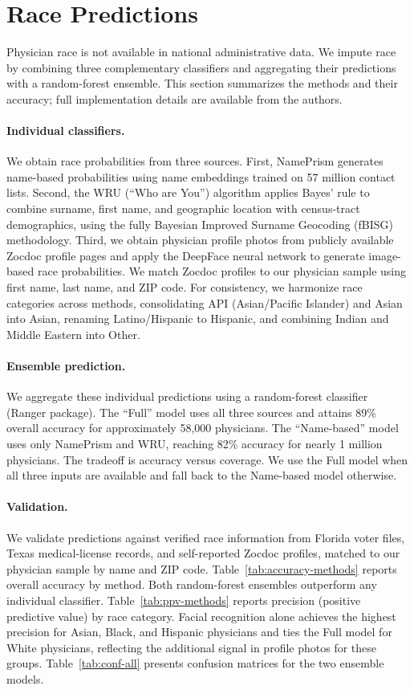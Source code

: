 \documentclass[12pt]{article}
\begin{document}
\section{Race Predictions}
\label{sec:race}

Physician race is not available in national administrative data. We impute race by combining three complementary classifiers and aggregating their predictions with a random-forest ensemble. This section summarizes the methods and their accuracy; full implementation details are available from the authors.

\paragraph{Individual classifiers.} We obtain race probabilities from three sources. First, NamePrism generates name-based probabilities using name embeddings trained on 57 million contact lists. Second, the WRU (``Who are You'') algorithm applies Bayes' rule to combine surname, first name, and geographic location with census-tract demographics, using the fully Bayesian Improved Surname Geocoding (fBISG) methodology. Third, we obtain physician profile photos from publicly available Zocdoc profile pages and apply the DeepFace neural network to generate image-based race probabilities. We match Zocdoc profiles to our physician sample using first name, last name, and ZIP code. For consistency, we harmonize race categories across methods, consolidating API (Asian/Pacific Islander) and Asian into Asian, renaming Latino/Hispanic to Hispanic, and combining Indian and Middle Eastern into Other.

\paragraph{Ensemble prediction.} We aggregate these individual predictions using a random-forest classifier (Ranger package). The ``Full'' model uses all three sources and attains 89\% overall accuracy for approximately 58,000 physicians. The ``Name-based'' model uses only NamePrism and WRU, reaching 82\% accuracy for nearly 1 million physicians. The tradeoff is accuracy versus coverage. We use the Full model when all three inputs are available and fall back to the Name-based model otherwise.

\paragraph{Validation.} We validate predictions against verified race information from Florida voter files, Texas medical-license records, and self-reported Zocdoc profiles, matched to our physician sample by name and ZIP code. Table~\ref{tab:accuracy-methods} reports overall accuracy by method. Both random-forest ensembles outperform any individual classifier. Table~\ref{tab:ppv-methods} reports precision (positive predictive value) by race category. Facial recognition alone achieves the highest precision for Asian, Black, and Hispanic physicians and ties the Full model for White physicians, reflecting the additional signal in profile photos for these groups. Table~\ref{tab:conf-all} presents confusion matrices for the two ensemble models.
\end{document}
